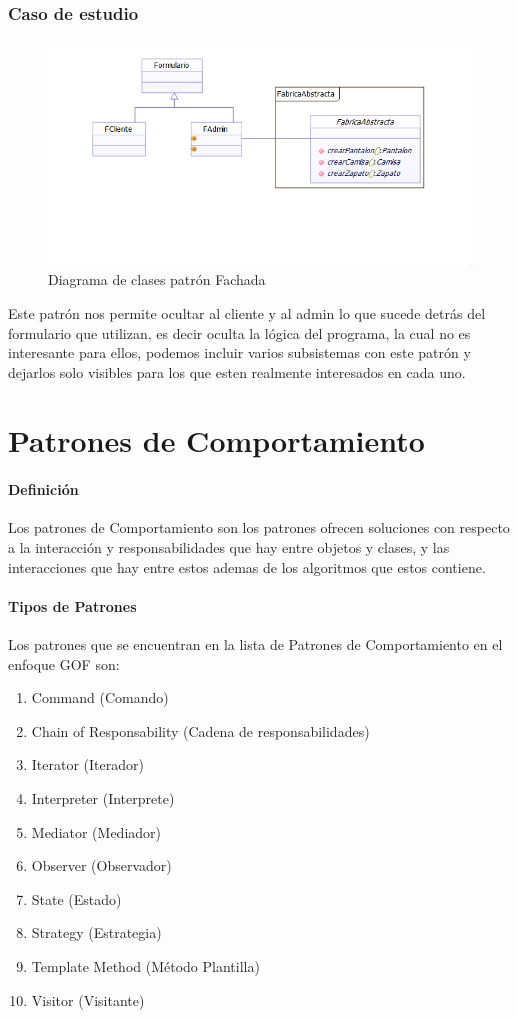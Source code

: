 \subsubsection{Caso de estudio}
\begin{figure}[h!]
	\centering
	\includegraphics[width=0.8\linewidth]{arquitectura/imagenes/DiagramaFachada}
	\caption{Diagrama de clases patrón Fachada}
\end{figure}

Este patrón nos permite ocultar al cliente y al admin lo que sucede detrás del formulario que utilizan, es decir oculta la lógica del programa, la cual no es interesante para ellos, podemos incluir varios subsistemas con este patrón y dejarlos solo visibles para los que esten realmente interesados en cada uno. 
\newpage

\section{Patrones de Comportamiento}
\paragraph{Definición}
Los patrones de Comportamiento son los patrones ofrecen soluciones con respecto a la interacción y responsabilidades que hay entre objetos y clases, y las interacciones que hay entre estos ademas de los algoritmos que estos contiene.
\paragraph{Tipos de Patrones}
Los patrones que se encuentran en la lista de Patrones de Comportamiento en el enfoque GOF son:
\begin{enumerate}
	\item Command (Comando)
	\item Chain of Responsability (Cadena de responsabilidades)
	\item Iterator (Iterador)
	\item Interpreter (Interprete)
	\item Mediator (Mediador)
	\item Observer (Observador)
	\item State (Estado)
	\item Strategy (Estrategia)
	\item Template Method (Método Plantilla)
	\item Visitor (Visitante)
\end{enumerate}

